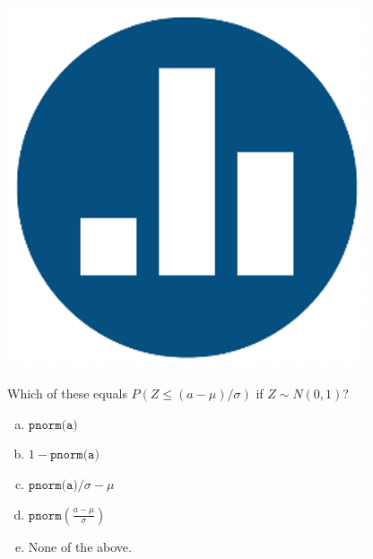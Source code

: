 \documentclass[handout]{beamer}
\begin{document}
\begin{frame}
\frametitle{\includegraphics[scale = 0.05]{./images/clicker}}
Which of these equals $P\left(Z \leq (a-\mu)/\sigma\right)$ if $Z\sim N(0,1)$?
	\begin{enumerate}[(a)]
    \item $\texttt{pnorm(a)}$
    \item $1 - \texttt{pnorm(a)}$
    \item $\texttt{pnorm(a)}/\sigma - \mu$
    \item $\texttt{pnorm}\left(\frac{a - \mu}{\sigma}  \right)$
		\item None of the above.
	\end{enumerate}
\end{frame}
\end{document}
